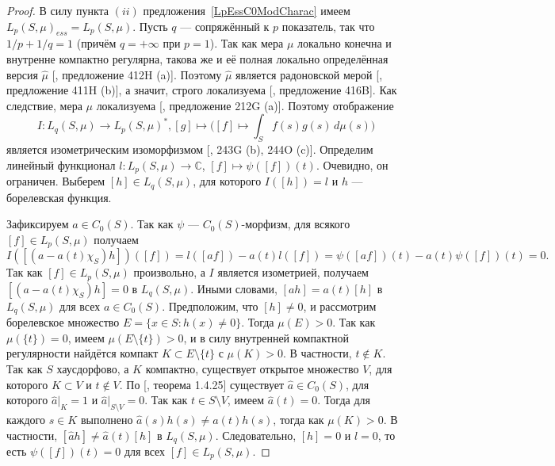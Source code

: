 \documentclass[12pt]{article}
\begin{document}
\begin{proof}
    В силу пункта $(ii)$ предложения~\ref{LpEssC0ModCharac} 
    имеем $L_p(S,\mu)_{ess}=L_p(S,\mu)$. Пусть $q$ --- сопряжённый к $p$ показатель, 
    так что $1/p+1/q=1$ (причём $q=+\infty$ при $p=1$). Так как мера $\mu$ локально 
    конечна и внутренне компактно регулярна, такова же и её полная локально
    определённая версия $\hat{\mu}$ [\cite{FremMeasTh4.1}, предложение 412H (a)]. 
    Поэтому $\hat{\mu}$ является радоновской 
    мерой [\cite{FremMeasTh4.1}, предложение 411H (b)], а значит, строго 
    локализуема [\cite{FremMeasTh4.1}, предложение 416B]. Как следствие, 
    мера $\mu$ локализуема [\cite{FremMeasTh2}, предложение 212G (a)]. Поэтому 
    отображение
    $$
        I:L_q(S,\mu)\to L_p(S,\mu)^*,
        [g]\mapsto\Big([f]\mapsto\int_S f(s)g(s)\,d\mu(s)\Big)
    $$
    является изометрическим изоморфизмом [\cite{FremMeasTh2}, 243G (b), 244O (c)]. 
    Определим линейный функционал 
    $
    	l: L_p(S,\mu)\to\mathbb{C}$, $[f]\mapsto\psi([f])(t).
    $
    Очевидно, он ограничен. Выберем $[h]\in L_q(S,\mu)$, для которого $I([h])=l$
    и $h$ --- борелевская функция.

    Зафиксируем $a\in C_0(S)$. Так как $\psi$ --- $C_0(S)$-морфизм, для 
    всякого $[f]\in L_p(S,\mu)$ получаем
    $$
        I([(a-a(t)\chi_S)h])([f])
        =l([af])-a(t)l([f])
        =\psi([af])(t)-a(t)\psi([f])(t)=0.
    $$
    Так как $[f]\in L_p(S,\mu)$ произвольно, а $I$ является изометрией, 
    получаем $[(a-a(t)\chi_S)h]=0$ в $L_q(S,\mu)$. Иными 
    словами, $[ah]=a(t)[h]$ в $L_q(S,\mu)$ для всех $a\in C_0(S)$. Предположим, 
    что $[h]\neq 0$, и рассмотрим борелевское 
    множество $E=\{x\in S:h(x)\neq 0\}$. Тогда $\mu(E)>0$. Так как $\mu(\{t\})=0$, 
    имеем $\mu(E\setminus\{t\})>0$, и в силу внутренней компактной регулярности
    найдётся компакт $K\subset E\setminus\{t\}$ с $\mu(K)>0$. 
    В частности, $t\notin K$. Так как $S$ хаусдорфово, а $K$ компактно, существует 
    открытое множество $V$, для которого $K\subset V$ и $t\notin V$. 
    По [\cite{DalesBanSpContFunDualSp}, теорема 1.4.25] существует $\hat{a}\in C_0(S)$, 
    для которого $\hat{a}|_K=1$ и $\hat{a}|_{S\setminus V}=0$. Так 
    как $t\in S\setminus V$, имеем $\hat{a}(t)=0$. Тогда для каждого $s\in K$ 
    выполнено $\hat{a}(s)h(s)\neq\hat{a}(t)h(s)$, тогда как $\mu(K)>0$. В 
    частности, $[\hat{a}h]\neq\hat{a}(t)[h]$ в $L_q(S,\mu)$. Следовательно, $[h]=0$ 
    и $l=0$, то есть $\psi([f])(t)=0$ для всех $[f]\in L_p(S,\mu)$.
\end{proof}
\end{document}
